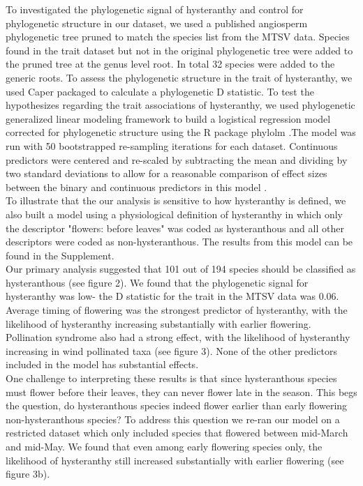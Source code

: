 \documentclass{article}
\begin{document}
\indent To investigated the phylogenetic signal of hysteranthy and control for phylogenetic structure in our dataset, we used a published angiosperm phylogenetic tree \citep{Zanne2013} pruned to match the species list from the MTSV data. Species found in the trait dataset but not in the original phylogenetic tree were added to the pruned tree at the genus level root. In total 32 species were added to the generic roots. To assess the phylogenetic structure in the trait of hysteranthy, we used Caper packaged \citep{Orme2013} to calculate a phylogenetic D statistic. To test the hypothesizes regarding the trait associations of hysteranthy, we used phylogenetic generalized linear modeling framework \citep{Ives2010} to build a logistical regression model corrected for phylogenetic structure using the R package phylolm \citep{Ho2014}.The model was run with 50 bootstrapped re-sampling iterations for each dataset. Continuous predictors were centered and re-scaled by subtracting the mean and dividing by two standard deviations to allow for a reasonable comparison of effect sizes between the binary and continuous predictors in this model \citep{Gelman2007}.\\
\indent To illustrate that the our analysis is sensitive to how hysteranthy is defined, we also built a model using a physiological definition of hysteranthy in which only the descriptor "flowers: before leaves" was coded as hysteranthous and all other descriptors were coded as non-hysteranthous. The results from this model can be found in the Supplement.\\
\indent Our primary analysis suggested that 101 out of 194 species should be classified as hysteranthous (see figure 2). We found that the phylogenetic signal for hysteranthy was low- the D statistic for the trait in the MTSV data was 0.06. Average timing of flowering was the strongest predictor of hysteranthy, with the likelihood of hysteranthy increasing substantially with earlier flowering. Pollination syndrome also had a strong effect, with the likelihood of hysteranthy increasing in wind pollinated taxa (see figure 3). None of the other predictors included in the model has substantial effects.\\
\indent One challenge to interpreting these results is that since hysteranthous species must flower before their leaves, they can never flower late in the season. This begs the question, do hysteranthous species indeed flower earlier than early flowering non-hysteranthous species? To address this question we re-ran our model on a restricted dataset which only included species that flowered between mid-March and mid-May. We found that even among early flowering species only, the likelihood of hysteranthy still increased substantially with earlier flowering (see figure 3b).\\ 
\end{document}
